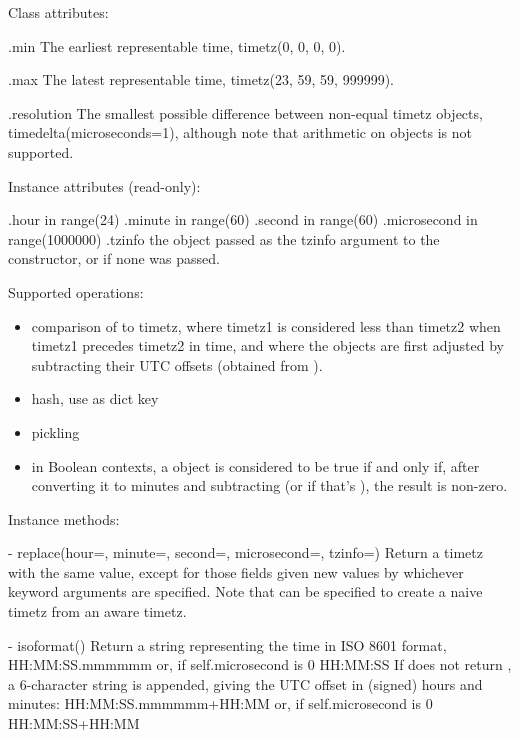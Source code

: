 Class attributes:

    .min
        The earliest representable time, timetz(0, 0, 0, 0).

    .max
        The latest representable time, timetz(23, 59, 59, 999999).

    .resolution
        The smallest possible difference between non-equal timetz
        objects, timedelta(microseconds=1), although note that
        arithmetic on  objects is not supported.

Instance attributes (read-only):

    .hour           in range(24)
    .minute         in range(60)
    .second         in range(60)
    .microsecond    in range(1000000)
    .tzinfo         the object passed as the tzinfo argument to the
                     constructor, or  if none
                    was passed.

Supported operations:

\begin{itemize}
  \item
    comparison of  to timetz, where timetz1 is considered
    less than timetz2 when timetz1 precedes timetz2 in time, and
    where the  objects are first adjusted by subtracting
    their UTC offsets (obtained from ).

  \item
    hash, use as dict key

  \item
    pickling

  \item
    in Boolean contexts, a  object is considered to be
    true if and only if, after converting it to minutes and
    subtracting  (or  if that's
    ), the result is non-zero.
\end{itemize}

Instance methods:

  - replace(hour=, minute=, second=, microsecond=, tzinfo=)
    Return a timetz with the same value, except for those fields given
    new values by whichever keyword arguments are specified.  Note that
     can be specified to create a naive timetz from an
    aware timetz.

  - isoformat()
    Return a string representing the time in ISO 8601 format,
        HH:MM:SS.mmmmmm
    or, if self.microsecond is 0
        HH:MM:SS
    If  does not return , a 6-character
    string is appended, giving the UTC offset in (signed) hours and
    minutes:
        HH:MM:SS.mmmmmm+HH:MM
    or, if self.microsecond is 0
        HH:MM:SS+HH:MM

